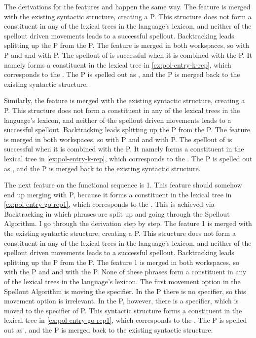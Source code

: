 The derivations for the features  and  happen the same way.
The feature  is merged with the existing syntactic structure, creating a P.
This structure does not form a constituent in any of the lexical trees in the language's lexicon, and neither of the spellout driven movements leads to a successful spellout.
Backtracking leads splitting up the P from the P.
The feature  is merged in both workspaces, so with P and and with P. The spellout of  is successful when it is combined with the P.
It namely forms a constituent in the lexical tree in \ref{ex:pol-entry-k-rep}, which corresponds to the .
The P is spelled out as , and the P is merged back to the existing syntactic structure.

Similarly, the feature  is merged with the existing syntactic structure, creating a P.
This structure does not form a constituent in any of the lexical trees in the language's lexicon, and neither of the spellout driven movements leads to a successful spellout.
Backtracking leads splitting up the P from the P.
The feature  is merged in both workspaces, so with P and and with P. The spellout of  is successful when it is combined with the P.
It namely forms a constituent in the lexical tree in \ref{ex:pol-entry-k-rep}, which corresponds to the .
The P is spelled out as , and the P is merged back to the existing syntactic structure.

The next feature on the functional sequence is 1. This feature should somehow end up merging with P, because it forms a constituent in the lexical tree in \ref{ex:pol-entry-go-rep1}, which corresponds to the . This is achieved via Backtracking in which phrases are split up and going through the Spellout Algorithm. I go through the derivation step by step.
The feature 1 is merged with the existing syntactic structure, creating a P.
This structure does not form a constituent in any of the lexical trees in the language's lexicon, and neither of the spellout driven movements leads to a successful spellout.
Backtracking leads splitting up the P from the P.
The feature 1 is merged in both workspaces, so with the P and and with the P. None of these phrases form a constituent in any of the lexical trees in the language's lexicon.
The first movement option in the Spellout Algorithm is moving the specifier. In the P there is no specifier, so this movement option is irrelevant. In the P, however, there is a specifier, which is moved to the specifier of P.
This syntactic structure forms a constituent in the lexical tree in \ref{ex:pol-entry-go-rep1}, which corresponds to the .
The P is spelled out as , and the P is merged back to the existing syntactic structure.


